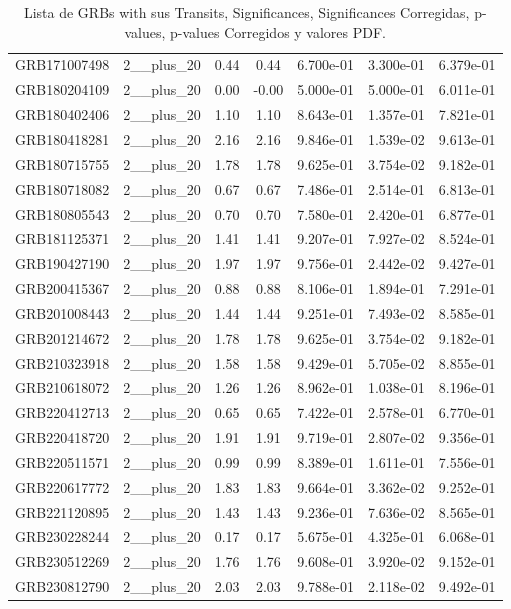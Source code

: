 \documentclass[12pt]{article}
\begin{document}
\begin{table}[h!]
{\begin{tabular}{l c c c c c c}
GRB171007498 & 2__plus_20 & 0.44 & 0.44 & 6.700e-01 & 3.300e-01 & 6.379e-01 \\
GRB180204109 & 2__plus_20 & 0.00 & -0.00 & 5.000e-01 & 5.000e-01 & 6.011e-01 \\
GRB180402406 & 2__plus_20 & 1.10 & 1.10 & 8.643e-01 & 1.357e-01 & 7.821e-01 \\
GRB180418281 & 2__plus_20 & 2.16 & 2.16 & 9.846e-01 & 1.539e-02 & 9.613e-01 \\
GRB180715755 & 2__plus_20 & 1.78 & 1.78 & 9.625e-01 & 3.754e-02 & 9.182e-01 \\
GRB180718082 & 2__plus_20 & 0.67 & 0.67 & 7.486e-01 & 2.514e-01 & 6.813e-01 \\
GRB180805543 & 2__plus_20 & 0.70 & 0.70 & 7.580e-01 & 2.420e-01 & 6.877e-01 \\
GRB181125371 & 2__plus_20 & 1.41 & 1.41 & 9.207e-01 & 7.927e-02 & 8.524e-01 \\
GRB190427190 & 2__plus_20 & 1.97 & 1.97 & 9.756e-01 & 2.442e-02 & 9.427e-01 \\
GRB200415367 & 2__plus_20 & 0.88 & 0.88 & 8.106e-01 & 1.894e-01 & 7.291e-01 \\
GRB201008443 & 2__plus_20 & 1.44 & 1.44 & 9.251e-01 & 7.493e-02 & 8.585e-01 \\
GRB201214672 & 2__plus_20 & 1.78 & 1.78 & 9.625e-01 & 3.754e-02 & 9.182e-01 \\
GRB210323918 & 2__plus_20 & 1.58 & 1.58 & 9.429e-01 & 5.705e-02 & 8.855e-01 \\
GRB210618072 & 2__plus_20 & 1.26 & 1.26 & 8.962e-01 & 1.038e-01 & 8.196e-01 \\
GRB220412713 & 2__plus_20 & 0.65 & 0.65 & 7.422e-01 & 2.578e-01 & 6.770e-01 \\
GRB220418720 & 2__plus_20 & 1.91 & 1.91 & 9.719e-01 & 2.807e-02 & 9.356e-01 \\
GRB220511571 & 2__plus_20 & 0.99 & 0.99 & 8.389e-01 & 1.611e-01 & 7.556e-01 \\
GRB220617772 & 2__plus_20 & 1.83 & 1.83 & 9.664e-01 & 3.362e-02 & 9.252e-01 \\
GRB221120895 & 2__plus_20 & 1.43 & 1.43 & 9.236e-01 & 7.636e-02 & 8.565e-01 \\
GRB230228244 & 2__plus_20 & 0.17 & 0.17 & 5.675e-01 & 4.325e-01 & 6.068e-01 \\
GRB230512269 & 2__plus_20 & 1.76 & 1.76 & 9.608e-01 & 3.920e-02 & 9.152e-01 \\
GRB230812790 & 2__plus_20 & 2.03 & 2.03 & 9.788e-01 & 2.118e-02 & 9.492e-01 \\
\bottomrule
\end{tabular}%
}
\caption{Lista de GRBs with sus Transits, Significances, Significances Corregidas, p-values, p-values Corregidos y valores PDF.}
\end{table}
\end{document}
